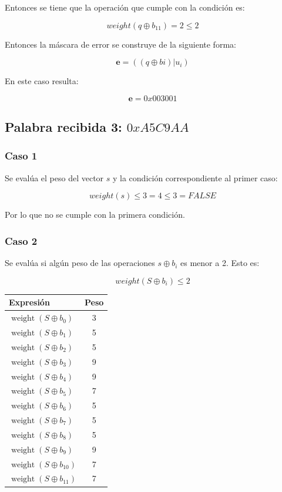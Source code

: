 Entonces se tiene que la operación que cumple con la condición es:

$$ weight(q \oplus b_{11}) = 2 \leq 2$$

Entonces la máscara de error se construye de la siguiente forma:

$$ \textbf{e} = ((q \oplus bi) | u_{i}) $$

En este caso resulta:

$$ \boxed{\textbf{e} = 0x003001}$$

\subsection{Palabra recibida 3: $0xA5C9AA$}

\subsubsection*{Caso 1}

Se evalúa el peso del vector $s$ y la condición correspondiente al primer caso:

$$ weight(s) \leq 3 = 4 \leq 3 = FALSE $$

Por lo que no se cumple con la primera condición.

\subsubsection*{Caso 2}

Se evalúa si algún peso de las operaciones $s \oplus b_{i}$ es menor a 2. Esto es:

$$ weight(S \oplus b_{i}) \leq 2 $$

\begin{table}[H]
    \centering
    \begin{tabular}{lc}
        \hline
        \textbf{Expresión} & \textbf{Peso} \\
        \hline
        $\operatorname{weight}(S \oplus b_0)$    & 3 \\
        $\operatorname{weight}(S \oplus b_1)$    & 5 \\
        $\operatorname{weight}(S \oplus b_2)$    & 5 \\
        $\operatorname{weight}(S \oplus b_3)$    & 9 \\
        $\operatorname{weight}(S \oplus b_4)$    & 9 \\
        $\operatorname{weight}(S \oplus b_5)$    & 7 \\
        $\operatorname{weight}(S \oplus b_6)$    & 5 \\
        $\operatorname{weight}(S \oplus b_7)$    & 5 \\
        $\operatorname{weight}(S \oplus b_8)$    & 5 \\
        $\operatorname{weight}(S \oplus b_9)$    & 9 \\
        $\operatorname{weight}(S \oplus b_{10})$ & 7 \\
        $\operatorname{weight}(S \oplus b_{11})$ & 7 \\
        \hline
    \end{tabular}
\end{table}


